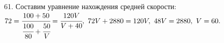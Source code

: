 61. Составим уравнение нахождения средней скорости: $72=\cfrac{100+50}{\cfrac{100}{80}+\cfrac{50}{V}}=\cfrac{120V}{V+40},\ 72V+2880=120V,\ 48V=2880,\ V=60.$\\
